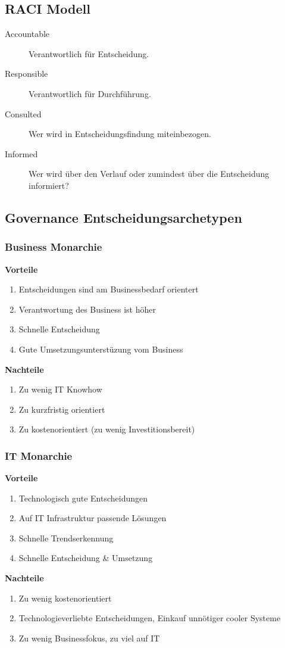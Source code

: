\subsection{RACI Modell}
\begin{description}
	\item[Accountable] Verantwortlich für Entscheidung.
	\item[Responsible] Verantwortlich für Durchführung.
	\item[Consulted] Wer wird in Entscheidungsfindung miteinbezogen.
	\item[Informed] Wer wird über den Verlauf oder zumindest über die Entscheidung informiert?
\end{description}
\subsection{Governance Entscheidungsarchetypen}
\subsubsection{Business Monarchie}
\textbf{Vorteile}
\begin{enumerate}
	\item Entscheidungen sind am Businessbedarf orientert
	\item Verantwortung des Business ist höher
	\item Schnelle Entscheidung
	\item Gute Umsetzungsunterstüzung vom Business
\end{enumerate}
\textbf{Nachteile}
\begin{enumerate}
	\item Zu wenig IT Knowhow
	\item Zu kurzfristig orientiert
	\item Zu kostenorientiert (zu wenig Investitionsbereit)
\end{enumerate}
\subsubsection{IT Monarchie}
\textbf{Vorteile}
\begin{enumerate}
	\item Technologisch gute Entscheidungen
	\item Auf IT Infrastruktur passende Lösungen
	\item Schnelle Trendserkennung
	\item Schnelle Entscheidung \& Umsetzung
\end{enumerate}
\textbf{Nachteile}
\begin{enumerate}
	\item Zu wenig kostenorientiert
	\item Technologieverliebte Entscheidungen, Einkauf unnötiger cooler Systeme
	\item Zu wenig Businessfokus, zu viel auf IT
\end{enumerate}
